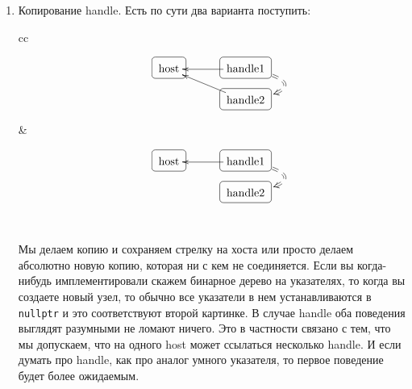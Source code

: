 \begin{enumerate}
\item Копирование handle.
Есть по сути два варианта поступить:
\begin{center}
\begin{tabular}{cc}
{
\begin{minipage}[\baselineskip]{5.5cm}
\[
\xymatrix@R=15pt@C=15pt{
  {\text{host}}
      	{
	\save
   [].[]*+[F-:<3pt>]\frm{}
   \restore
	}
  &{}&{\text{handle1}}\ar[ll]\ar@{==>}@/^30pt/[d]<5pt>
    	{
	\save
   [].[]*+[F-:<3pt>]\frm{}
   \restore
	}
  \\
  {}
  &{}&{\text{handle2}}\ar[llu]
    	{
	\save
   [].[]*+[F-:<3pt>]\frm{}
   \restore
	}
  \\ 
}
\]
\end{minipage}
}&{
\begin{minipage}[\baselineskip]{5.5cm}
\[
\xymatrix@R=15pt@C=15pt{
  {\text{host}}
      	{
	\save
   [].[]*+[F-:<3pt>]\frm{}
   \restore
	}
  &{}&{\text{handle1}}\ar[ll]\ar@{==>}@/^30pt/[d]<5pt>
    	{
	\save
   [].[]*+[F-:<3pt>]\frm{}
   \restore
	}
  \\ 
  {}
  &{}&{\text{handle2}}
    	{
	\save
   [].[]*+[F-:<3pt>]\frm{}
   \restore
	}
  \\ 
}
\]
\end{minipage}
}\\
\end{tabular}
\end{center}
Мы делаем копию и сохраняем стрелку на хоста или просто делаем абсолютно новую копию, которая ни с кем не соединяется.
Если вы когда-нибудь имплементировали скажем бинарное дерево на указателях, то когда вы создаете новый узел, то обычно все указатели в нем устанавливаются в \verb"nullptr" и это соответствуют второй картинке.
В случае handle оба поведения выглядят разумными не ломают ничего.
Это в частности связано с тем, что мы допускаем, что на одного host может ссылаться несколько handle.
И если думать про handle, как про аналог умного указателя, то первое поведение будет более ожидаемым.


\end{enumerate}
